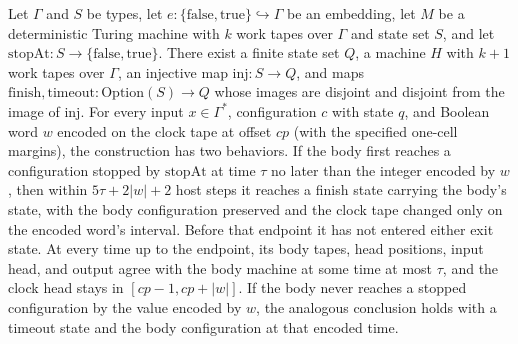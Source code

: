 \begin{theorem}
\label{Turing.exists_stepClockTMVia}
\leanok
{}
Let $\Gamma$ and $S$ be types, let $e:\{\mathrm{false},\mathrm{true}\}\hookrightarrow\Gamma$
be an embedding, let $M$ be a deterministic Turing machine with $k$ work tapes over
$\Gamma$ and state set $S$, and let $\mathrm{stopAt}:S\to\{\mathrm{false},\mathrm{true}\}$.
There exist a finite state set $Q$, a machine $H$ with $k+1$ work tapes over $\Gamma$,
an injective map $\mathrm{inj}:S\to Q$, and maps
$\mathrm{finish},\mathrm{timeout}:\mathrm{Option}(S)\to Q$ whose images are disjoint
and disjoint from the image of $\mathrm{inj}$. For every input $x\in\Gamma^*$,
configuration $c$ with state $q$, and Boolean word $w$ encoded on the clock tape at
offset $cp$ (with the specified one-cell margins), the construction has two behaviors.
If the body first reaches a configuration stopped by $\mathrm{stopAt}$ at time $\tau$
no later than the integer encoded by $w$, then within $5\tau+2|w|+2$ host steps it
reaches a finish state carrying the body's state, with the body configuration preserved
and the clock tape changed only on the encoded word's interval. Before that endpoint it
has not entered either exit state. At every time up to the endpoint, its body tapes,
head positions, input head, and output agree with the body machine at some time at most
$\tau$, and the clock head stays in $[cp-1,cp+|w|]$. If the body never reaches a
stopped configuration by the value encoded by $w$, the analogous conclusion holds with
a timeout state and the body configuration at that encoded time.
\end{theorem}

